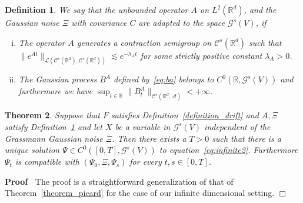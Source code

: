 \documentclass{article}
\newenvironment{enumerateroman}{\begin{enumerate}[i.] }{\end{enumerate}}
\newenvironment{proof}{\noindent\textbf{Proof\ }}{\hspace*{\fill}$\Box$\medskip}
\newtheorem{theorem}{Theorem}
\newtheorem{definition}[theorem]{Definition}
\begin{document}
\begin{definition}
  \label{definition_infinitelinear}We say that the unbounded operator $A$ on
  $L^2 (\mathbb{R}^d)$, and the Gaussian noise $\Xi$ with covariance $C$ are
  adapted to the space $\mathcal{G}^s (V)$, if
  \begin{enumerateroman}
    \item The operator $A$ generates a contraction semigroup on $\mathcal{C}^s
    (\mathbb{R}^d)$ such that $\| e^{A t} \|_{\mathcal{L} (\mathcal{C}^s
    (\mathbb{R}^d), \mathcal{C}^s (\mathbb{R}^d))} \lesssim e^{- \lambda_A t}$
    for some strictly positive constant $\lambda_A > 0$.
    
    \item The Gaussian process $B^A$ defined by~{\eqref{eq:ba}} belongs to
    $C^0 (\mathbb{R}, \mathcal{G}^s (V))$ and furthermore we have $\sup_{t \in
    \mathbb{R}} \| B_t^A \|_{\mathcal{C}^s (\mathbb{R}^d, \mathcal{A})} < +
    \infty$.
  \end{enumerateroman}
\end{definition}

\begin{theorem}
  \label{theorem_existence2}Suppose that $F$ satisfies
  Definition~\ref{definition_drift} and $A, \Xi$ satisfy
  Definition~\ref{definition_infinitelinear} and let $X$ be a variable in
  $\mathcal{G}^s (V)$ independent of the Grassmann Gaussian noise $\Xi$. Then
  there exists a $T > 0$ such that there is a unique solution $\Psi \in C^0
  ([0, T], \mathcal{G}^s (V))$ to equation~{\eqref{eq:infinite2}}. Furthermore
  $\Psi_t$ is compatible with $(\Psi_0, \Xi, \Psi_s)$ for every $t, s \in [0,
  T]$.
\end{theorem}

\begin{proof}
  The proof is a straightforward generalization of that of
  Theorem~\ref{theorem_picard} for the case of our infinite dimensional
  setting.
\end{proof}
\end{document}
